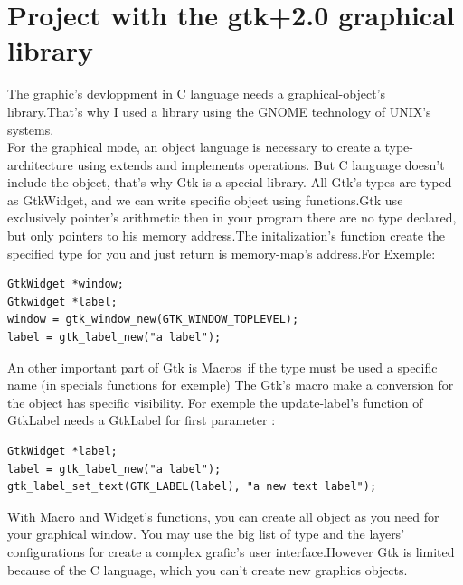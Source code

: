 \documentclass[11pt]{sample}
\begin{document}
\section{Project with the gtk+2.0 graphical library}
The graphic's devloppment in C language needs a graphical-object's library.That's why I used a library using the GNOME technology of UNIX's systems.
\\For the graphical mode, an object language is necessary to create a type-architecture using extends and implements operations. But C language doesn't include the object, that's why Gtk is a special library. All Gtk's types are typed as GtkWidget, and we can write specific object using functions.Gtk use exclusively pointer's arithmetic then in your program there are no type declared, but only pointers to his memory address.The initalization's function create the specified type for you and just return is memory-map's address.For Exemple:\\
\begin{verbatim}
GtkWidget *window;
Gtkwidget *label;
window = gtk_window_new(GTK_WINDOW_TOPLEVEL);
label = gtk_label_new("a label");
\end{verbatim}
An other important part of Gtk is Macros\footnotemark \ if the type must be used a specific name (in specials functions for exemple) The Gtk's macro make a conversion for the object has specific visibility. For exemple the update-label's function of GtkLabel needs a GtkLabel for first parameter :\\

\begin{verbatim}
GtkWidget *label;
label = gtk_label_new("a label");
gtk_label_set_text(GTK_LABEL(label), "a new text label");
\end{verbatim}
With Macro and Widget's functions, you can create all object as you need for your graphical window. You may use the big list of type and the layers' configurations for create a complex grafic's user interface.However Gtk is limited because of the C language, which you can't create new graphics objects. 
\end{document}
